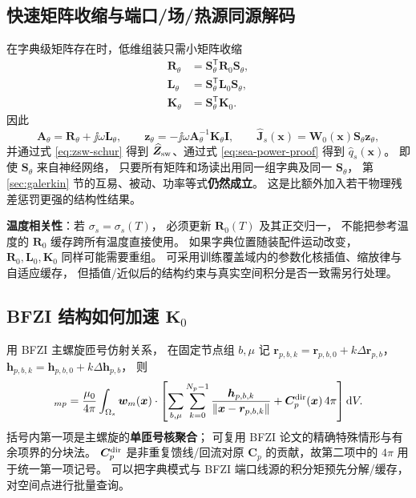 \subsection{快速矩阵收缩与端口/场/热源同源解码}
在字典级矩阵存在时，低维组装只需小矩阵收缩
\begin{equation}
\boxed{
\begin{aligned}
\bm R_\theta&=\bm S_\theta^{\mathsf T}\bm R_0\bm S_\theta,\\
\bm L_\theta&=\bm S_\theta^{\mathsf T}\bm L_0\bm S_\theta,\\
\bm K_\theta&=\bm S_\theta^{\mathsf T}\bm K_0.
\end{aligned}}\label{eq:structured-contractions}
\end{equation}
因此
\[
\bm A_\theta=\bm R_\theta+\jj\omega\bm L_\theta,\qquad
\bm z_\theta=-\jj\omega\bm A_\theta^{-1}\bm K_\theta\bm I,\qquad
\widehat{\bm J}_s(\bm x)=\bm W_0(\bm x)\bm S_\theta\bm z_\theta,
\]
并通过式 \eqref{eq:zsw-schur} 得到
\(\widehat{\bm Z}_{\rm sw}\)、通过式 \eqref{eq:sea-power-proof}
得到 \(\widehat q_s(\bm x)\)。
即使 \(\bm S_\theta\) 来自神经网络，
只要所有矩阵和场读出用同一组字典及同一 \(\bm S_\theta\)，
第 \ref{sec:galerkin} 节的互易、被动、功率等式\textbf{仍然成立}。
这是比额外加入若干物理残差惩罚更强的结构性结果。

\textbf{温度相关性}：若 \(\sigma_s=\sigma_s(T)\)，
必须更新 \(\bm R_0(T)\) 及其正交归一，
不能把参考温度的 \(\bm R_0\) 缓存跨所有温度直接使用。
如果字典位置随装配件运动改变，
\(\bm R_0,\bm L_0,\bm K_0\) 同样可能需要重组。
可采用训练覆盖域内的参数化核插值、缩放律与自适应缓存，
但插值/近似后的结构约束与真实空间积分是否一致需另行处理。

\subsection{BFZI 结构如何加速 \(\bm K_0\)}
用 BFZI 主螺旋匝号仿射关系，
在固定节点组 \(b,\mu\) 记
\(\bm r_{p,b,k}=\bm r_{p,b,0}+k\Delta\bm r_{p,b}\)，
\(\bm h_{p,b,k}=\bm h_{p,b,0}+k\Delta\bm h_{p,b}\)，
则
\begin{equation}
[\bm K_0]_{mp}
=\frac{\mu_0}{4\pi}
\int_{\Omega_s}\bm w_m(\bm x)\cdot
\left[
\sum_{b,\mu}\sum_{k=0}^{N_p-1}
\frac{\bm h_{p,b,k}}{\|\bm x-\bm r_{p,b,k}\|}
+\bm C_p^{\rm dir}(\bm x)\,4\pi
\right]\mathrm dV.
\label{eq:bfzi-K-assembly}
\end{equation}
括号内第一项是主螺旋的\textbf{单匝号核聚合}；
可复用 BFZI 论文的精确特殊情形与有余项界的分块法。
\(\bm C_p^{\rm dir}\) 是非重复馈线/回流对原 \(\bm C_p\)
的贡献，故第二项中的 \(4\pi\) 用于统一第一项记号。
可以把字典模式与 BFZI 端口线源的积分矩预先分解/缓存，
对空间点进行批量查询。

